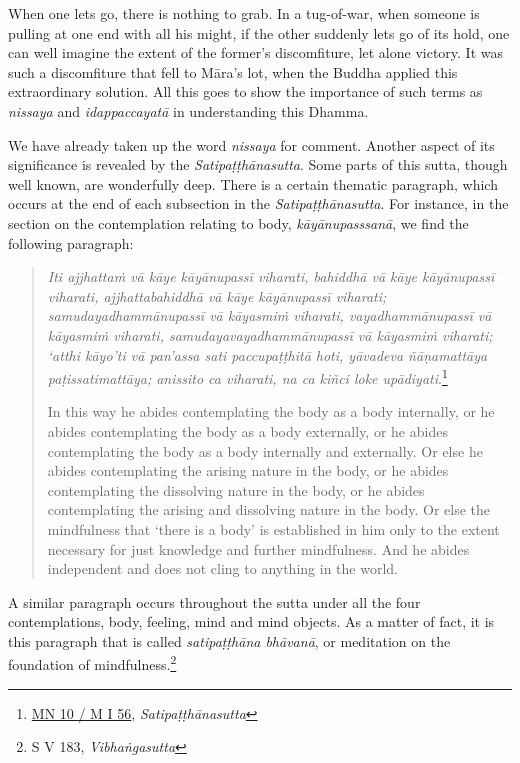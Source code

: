 When one lets go, there is nothing to grab. In a tug-of-war, when someone is pulling at one end with all his might, if the other suddenly lets go of its hold, one can well imagine the extent of the former's discomfiture, let alone victory. It was such a discomfiture that fell to Māra's lot, when the Buddha applied this extraordinary solution. All this goes to show the importance of such terms as \emph{nissaya} and \emph{idappaccayatā} in understanding this Dhamma.

We have already taken up the word \emph{nissaya} for comment. Another aspect of its significance is revealed by the \emph{Satipaṭṭhānasutta}. Some parts of this sutta, though well known, are wonderfully deep. There is a certain thematic paragraph, which occurs at the end of each subsection in the \emph{Satipaṭṭhānasutta}. For instance, in the section on the contemplation relating to body, \emph{kāyānupasssanā}, we find the following paragraph:

\begin{quote}
\emph{Iti ajjhattaṁ vā kāye kāyānupassī viharati, bahiddhā vā kāye kāyānupassī viharati, ajjhattabahiddhā vā kāye kāyānupassī viharati; samudayadhammānupassī vā kāyasmiṁ viharati, vayadhammānupassī vā kāyasmiṁ viharati, samudayavayadhammānupassī vā kāyasmiṁ viharati; `atthi kāyo'ti vā pan'assa sati paccupaṭṭhitā hoti, yāvadeva ñāṇamattāya paṭissatimattāya; anissito ca viharati, na ca kiñci loke upādiyati}.\footnote{\href{https://suttacentral.net/mn10/pli/ms}{MN 10 / M I 56}, \emph{Satipaṭṭhānasutta}}

In this way he abides contemplating the body as a body internally, or he abides contemplating the body as a body externally, or he abides contemplating the body as a body internally and externally. Or else he abides contemplating the arising nature in the body, or he abides contemplating the dissolving nature in the body, or he abides contemplating the arising and dissolving nature in the body. Or else the mindfulness that `there is a body' is established in him only to the extent necessary for just knowledge and further mindfulness. And he abides independent and does not cling to anything in the world.
\end{quote}

A similar paragraph occurs throughout the sutta under all the four contemplations, body, feeling, mind and mind objects. As a matter of fact, it is this paragraph that is called \emph{satipaṭṭhāna bhāvanā}, or meditation on the foundation of mindfulness.\footnote{S V 183, \emph{Vibhaṅgasutta}}

